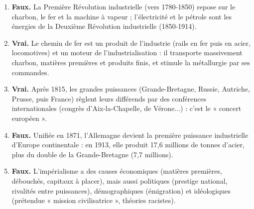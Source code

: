 \documentclass[11pt]{article}
\begin{document}
\begin{corrige}
\begin{enumerate}
\item \textbf{Faux.} La Première Révolution industrielle (vers 1780-1850) repose sur le charbon, le fer et la machine à vapeur ; l'électricité et le pétrole sont les énergies de la Deuxième Révolution industrielle (1850-1914).
\item \textbf{Vrai.} Le chemin de fer est un produit de l'industrie (rails en fer puis en acier, locomotives) et un moteur de l'industrialisation : il transporte massivement charbon, matières premières et produits finis, et stimule la métallurgie par ses commandes.
\item \textbf{Vrai.} Après 1815, les grandes puissances (Grande-Bretagne, Russie, Autriche, Prusse, puis France) règlent leurs différends par des conférences internationales (congrès d'Aix-la-Chapelle, de Vérone...) : c'est le « concert européen ».
\item \textbf{Faux.} Unifiée en 1871, l'Allemagne devient la première puissance industrielle d'Europe continentale : en 1913, elle produit 17,6 millions de tonnes d'acier, plus du double de la Grande-Bretagne (7,7 millions).
\item \textbf{Faux.} L'impérialisme a des causes économiques (matières premières, débouchés, capitaux à placer), mais aussi politiques (prestige national, rivalités entre puissances), démographiques (émigration) et idéologiques (prétendue « mission civilisatrice », théories racistes).
\end{enumerate}
\end{corrige}
\end{document}

